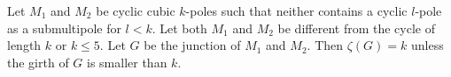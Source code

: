 \documentclass[12pt, twoside]{book}
\begin{document}
%	
%	


\begin{theorem}\label{th:junction-of-kpoles-cyclic-edge-connectivity}
	Let $M_1$ and $M_2$ be cyclic cubic $k$-poles such that neither contains a cyclic $l$-pole as a submultipole for $l<k$. Let both $M_1$ and $M_2$ be different from the cycle of length $k$ or $k\leq 5$. Let $G$ be the junction of $M_1$ and $M_2$. Then $\zeta(G)=k$ unless the girth of $G$ is smaller than $k$.
\end{theorem}
\end{document}
